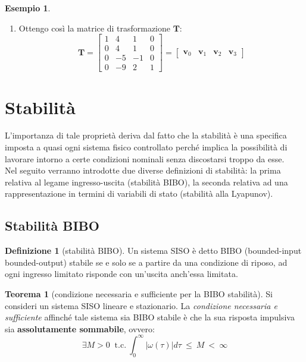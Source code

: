 \documentclass[a4paper]{article}
\renewcommand{\vec}{\bm}
\theoremstyle{definition}
\newtheorem{thm}{Teorema}[subsection]
\newtheorem{exmp}{Esempio}[section]
\newtheorem{defn}{Definizione}[subsection]
\begin{document}
\begin{exmp}
\begin{enumerate}
					\item Ottengo così la matrice di trasformazione $ \vec{T} $:
					\[
					    \vec{T}=
						\begin{bmatrix}
							1 & 4 & 1 & 0 \\
							0 & 4 & 1 & 0 \\
							0 & -5 & -1 & 0 \\
							0 & -9 & 2 & 1
						\end{bmatrix}
						=
						\begin{bmatrix}
							\vec{v}_0 & \vec{v}_1 & \vec{v}_2 & \vec{v}_3 
						\end{bmatrix}
					\]
				\end{enumerate}
				
				
			\end{exmp}
			
		\newpage
		
		\section{Stabilità}
			L’importanza di tale proprietà deriva dal fatto che la stabilità
			è una specifica imposta a quasi ogni sistema fisico controllato perché implica la possibilità di lavorare intorno a certe condizioni nominali senza discostarsi troppo da esse.\\
			Nel seguito verranno introdotte due diverse definizioni di stabilità: la prima relativa al legame ingresso-uscita (stabilità BIBO), la seconda relativa ad una rappresentazione in termini di variabili di stato (stabilità alla Lyapunov).
			
			\subsection{Stabilità BIBO}
				\begin{defn}[stabilità BIBO]
					Un sistema SISO è detto BIBO (bounded-input bounded-output)
					stabile se e solo se a partire da una condizione di riposo, ad ogni ingresso limitato
					risponde con un’uscita anch’essa limitata.
				\end{defn}
				
				\begin{thm}[condizione necessaria e sufficiente per la BIBO stabilità]
					Si consideri un sistema SISO lineare e stazionario. La \textit{condizione necessaria e sufficiente} affinché tale sistema sia BIBO stabile è che la sua risposta impulsiva sia \textbf{assolutamente sommabile}, ovvero:
					\[
						\exists M>0\ \text{ t.c.}\ \int^{\infty}_0 \lvert \omega (\tau) \rvert d\tau\ \leq\ M\ <\ \infty
					\]
				\end{thm}
				
\end{document}
